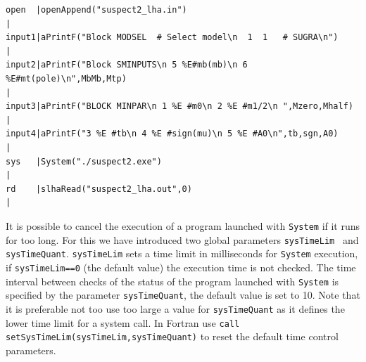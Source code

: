 \documentclass[12pt,a4paper]{article}
\begin{document}
\begin{verbatim}
open  |openAppend("suspect2_lha.in")                                                                                                                                                                                                                             |
input1|aPrintF("Block MODSEL  # Select model\n  1  1   # SUGRA\n")                                                                                                                                                                              |
input2|aPrintF("Block SMINPUTS\n 5 %E#mb(mb)\n 6 %E#mt(pole)\n",MbMb,Mtp)                                                                                                                                                               |
input3|aPrintF("BLOCK MINPAR\n 1 %E #m0\n 2 %E #m1/2\n ",Mzero,Mhalf)                                                                                                                                          |
input4|aPrintF("3 %E #tb\n 4 %E #sign(mu)\n 5 %E #A0\n",tb,sgn,A0)                                                                                                                                          |
sys   |System("./suspect2.exe")                                                                                                                                                                                                                                 |
rd    |slhaRead("suspect2_lha.out",0)                                                                                                                                                                                                                           |
\end{verbatim}

It is possible to cancel the execution of a program launched with  \verb|System|  if it runs for too long. For this we have introduced two
global parameters  {\tt  sysTimeLim } and {\tt  sysTimeQuant}.
{\tt  sysTimeLim} sets a time limit  in milliseconds for {\tt System} execution, if 
{\tt  sysTimeLim==0} (the default value) the execution time is not checked. 
The time interval between checks of the status of the program launched with  \verb|System|  is specified by the parameter
{\tt sysTimeQuant}, the default value is set to 10.  
Note that it is preferable not too use too large a value for {\tt sysTimeQuant} as it defines the lower time limit for a system call. 
In Fortran use \verb|call setSysTimeLim(sysTimeLim,sysTimeQuant)| to reset the default time control
parameters. 
\end{document}
